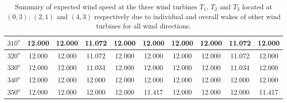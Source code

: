 \begin{table}[H]
\begin{tabular}{|c|c|c|c|c|c|c|c|c|c|}
	         \hline
	         $310^{o}$ & 12.000 & 12.000 & 11.072 & 12.000 & 12.000 & 12.000 & 12.000& 11.072 & 12.000  \\
	         \hline
	         $320^{o}$ & 12.000 & 12.000 & 11.072 & 12.000 & 12.000 & 12.000 & 12.000& 11.072 & 12.000  \\
	         \hline
	         $330^{o}$ & 12.000 & 12.000 & 11.034 & 12.000 & 12.000 & 12.000 & 12.000& 11.034 & 12.000  \\
	         \hline
	         $340^{o}$ & 12.000 & 12.000 & 12.000 & 12.000 & 12.000 & 12.000 & 12.000& 12.000 & 12.000  \\
	         \hline
	         $350^{o}$ & 12.000 & 12.000 & 12.000 & 12.000 & 11.417 & 12.000 & 12.000& 12.000 & 11.417  \\
	         \hline
	         
	    \end{tabular}
	    
	    \caption{Summary of expected wind speed at the three wind turbines $T_1$, $T_2$ and $T_3$ located at $(0,3)$, $(2,1)$ and $(4,3)$ respectively due to individual and overall wakes of other wind turbines for all wind directions.}
	    \label{summaryRandom2-3a}
	\end{table}
	\doublespacing
	
